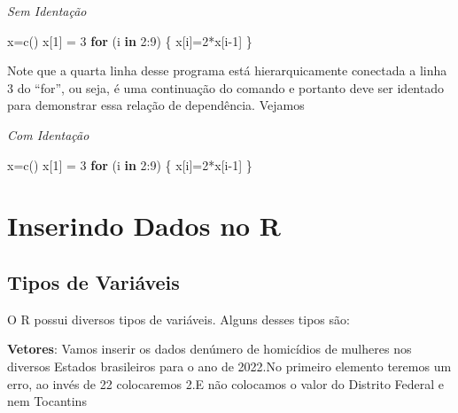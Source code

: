 \documentclass[
  letterpaper,
  DIV=11,
  numbers=noendperiod]{scrreprt}
\newenvironment{Shaded}{\begin{snugshade}}{\end{snugshade}}
\newcommand{\ControlFlowTok}[1]{\textcolor[rgb]{0.00,0.23,0.31}{\textbf{#1}}}
\newcommand{\DecValTok}[1]{\textcolor[rgb]{0.68,0.00,0.00}{#1}}
\newcommand{\FunctionTok}[1]{\textcolor[rgb]{0.28,0.35,0.67}{#1}}
\newcommand{\NormalTok}[1]{\textcolor[rgb]{0.00,0.23,0.31}{#1}}
\newcommand{\OtherTok}[1]{\textcolor[rgb]{0.00,0.23,0.31}{#1}}
\newcommand{\SpecialCharTok}[1]{\textcolor[rgb]{0.37,0.37,0.37}{#1}}
\begin{document}
\emph{Sem Identação}

\begin{Shaded}
\begin{Highlighting}[]
\NormalTok{x}\OtherTok{=}\FunctionTok{c}\NormalTok{()}
\NormalTok{x[}\DecValTok{1}\NormalTok{] }\OtherTok{=} \DecValTok{3}
\ControlFlowTok{for}\NormalTok{ (i }\ControlFlowTok{in} \DecValTok{2}\SpecialCharTok{:}\DecValTok{9}\NormalTok{) \{ }
\NormalTok{x[i]}\OtherTok{=}\DecValTok{2}\SpecialCharTok{*}\NormalTok{x[i}\DecValTok{{-}1}\NormalTok{]}
\NormalTok{\}}
\end{Highlighting}
\end{Shaded}

Note que a quarta linha desse programa está hierarquicamente conectada a
linha 3 do ``for'', ou seja, é uma continuação do comando e portanto
deve ser identado para demonstrar essa relação de dependência. Vejamos

\emph{Com Identação}

\begin{Shaded}
\begin{Highlighting}[]
\NormalTok{x}\OtherTok{=}\FunctionTok{c}\NormalTok{()}
\NormalTok{x[}\DecValTok{1}\NormalTok{] }\OtherTok{=} \DecValTok{3}
\ControlFlowTok{for}\NormalTok{ (i }\ControlFlowTok{in} \DecValTok{2}\SpecialCharTok{:}\DecValTok{9}\NormalTok{) \{ }
\NormalTok{  x[i]}\OtherTok{=}\DecValTok{2}\SpecialCharTok{*}\NormalTok{x[i}\DecValTok{{-}1}\NormalTok{]}
\NormalTok{\}}
\end{Highlighting}
\end{Shaded}

\section{Inserindo Dados no R}\label{inserindo-dados-no-r}

\subsection{Tipos de Variáveis}\label{tipos-de-variuxe1veis}

O R possui diversos tipos de variáveis. Alguns desses tipos são:

\textbf{Vetores}: Vamos inserir os dados denúmero de homicídios de
mulheres nos diversos Estados brasileiros para o ano de 2022.No primeiro
elemento teremos um erro, ao invés de 22 colocaremos 2.E não colocamos o
valor do Distrito Federal e nem Tocantins
\end{document}
